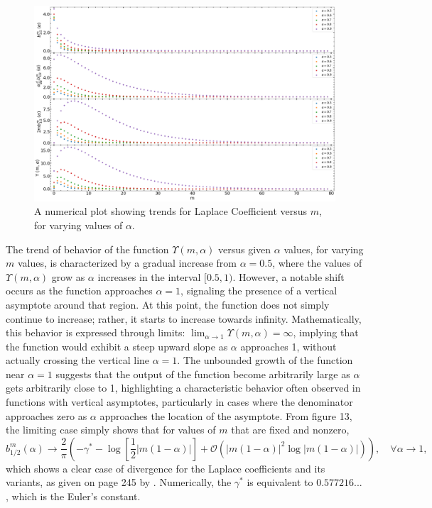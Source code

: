\documentclass{article}
\begin{document}
\begin{figure}
    \centering
    \includegraphics[width=1\linewidth]{laplace_plot_A.png}
    \caption{A numerical plot showing trends for Laplace Coefficient versus $m$, for varying values of $\alpha$.}
    \label{fig:enter-label}
\end{figure}


The trend of behavior of the function $\Upsilon(m,\alpha)$ versus given $\alpha$ values, for varying $m$ values, is characterized by a gradual increase from $\alpha =0.5$, where the values of $\Upsilon(m,\alpha)$  grow as $\alpha$ increases in the interval \([0.5, 1)\). However, a notable shift occurs as the function approaches \(\alpha=1\), signaling the presence of a vertical asymptote around that region. At this point, the function does not simply continue to increase; rather, it starts to increase towards infinity. Mathematically, this behavior is expressed through limits: $\lim_{{\alpha \to 1}} \Upsilon(m,\alpha) = \infty$, implying that the function would exhibit a steep upward slope as $\alpha$ approaches 1, without actually crossing the vertical line $\alpha=1$. The unbounded growth of the function near $\alpha=1$ suggests that the output of the function become arbitrarily large as $\alpha$ gets arbitrarily close to 1, highlighting a characteristic behavior often observed in functions with vertical asymptotes, particularly in cases where the denominator approaches zero as $\alpha$ approaches the location of the asymptote. From figure 13, the limiting case simply shows that for values of $m$ that are fixed and nonzero, 
\begin{equation}
b_{1/2}^{m}(\alpha) \rightarrow \frac{2}{\pi}\left( - \gamma^{*} - \log\left[\frac{1}{2}|m(1-\alpha)|\right] + \mathcal{O}\left(|m(1-\alpha)|^{2}\log|m(1-\alpha)|\right) \right), \quad \forall \alpha \rightarrow 1,
\end{equation}
which shows a clear case of divergence for the Laplace coefficients and its variants, as given on page 245 by \cite{tremaine2023dynamics}. Numerically, the $\gamma^{*}$ is equivalent to $0.577216...$, which is the Euler's constant.
\end{document}
